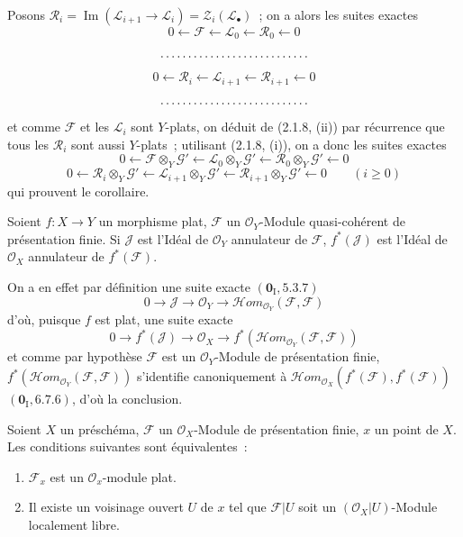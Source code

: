 Posons
$\mathscr R_i=\operatorname{Im}(\mathscr L_{i+1}\to\mathscr L_i)
=\mathscr Z_i(\mathscr L_\bullet)$~; on a alors les suites exactes
\[
0\leftarrow\mathscr F\leftarrow\mathscr L_0\leftarrow\mathscr R_0\leftarrow0
\]
\[
\hbox to 12em{\dotfill}
\]
\[
0\leftarrow\mathscr R_i\leftarrow\mathscr L_{i+1}
\leftarrow\mathscr R_{i+1}\leftarrow0
\]
\[
\hbox to 12em{\dotfill}
\]
et comme $\mathscr F$ et les $\mathscr L_i$ sont $Y$-plats, on déduit de
(2.1.8, (ii)) par récurrence que tous les $\mathscr R_i$ sont aussi
$Y$-plats~; utilisant (2.1.8, (i)), on a donc les suites exactes
\[
0\leftarrow\mathscr F\otimes_Y\mathscr G'
\leftarrow\mathscr L_0\otimes_Y\mathscr G'
\leftarrow\mathscr R_0\otimes_Y\mathscr G'\leftarrow0
\]
\[
0\leftarrow\mathscr R_i\otimes_Y\mathscr G'
\leftarrow\mathscr L_{i+1}\otimes_Y\mathscr G'
\leftarrow\mathscr R_{i+1}\otimes_Y\mathscr G'\leftarrow0
\qquad(i\geq0)
\]
qui prouvent le corollaire.

\begin{proposition}[2.1.11]
\label{IV.2.1.11-fr}
Soient $f:X\to Y$ un morphisme plat, $\mathscr F$ un $\mathcal O_Y$-Module
quasi-cohérent de présentation finie. Si $\mathscr J$ est l'Idéal de
$\mathcal O_Y$ annulateur de $\mathscr F$, $f^*(\mathscr J)$ est l'Idéal de
$\mathcal O_X$ annulateur de $f^*(\mathscr F)$.
\end{proposition}

On a en effet par définition une suite exacte $(\mathbf{0}_{\mathrm I},5.3.7)$
\[
0\to\mathscr J\to\mathcal O_Y\to
\mathscr H\!om_{\mathcal O_Y}(\mathscr F,\mathscr F)
\]
d'où, puisque $f$ est plat, une suite exacte
\[
0\to f^*(\mathscr J)\to\mathcal O_X\to
f^*(\mathscr H\!om_{\mathcal O_Y}(\mathscr F,\mathscr F))
\]
et comme par hypothèse $\mathscr F$ est un $\mathcal O_Y$-Module de
présentation finie,
$f^*(\mathscr H\!om_{\mathcal O_Y}(\mathscr F,\mathscr F))$ s'identifie
canoniquement à
$\mathscr H\!om_{\mathcal O_X}(f^*(\mathscr F),f^*(\mathscr F))$
$(\mathbf{0}_{\mathrm I},6.7.6)$, d'où la conclusion.

\begin{proposition}[2.1.12]
\label{IV.2.1.12-fr}
Soient $X$ un préschéma, $\mathscr F$ un $\mathcal O_X$-Module de présentation
finie, $x$ un point de $X$. Les conditions suivantes sont équivalentes~:
\begin{enumerate}
\item[\emph{a)}] $\mathscr F_x$ est un $\mathcal O_x$-module plat.
\item[\emph{b)}] Il existe un voisinage ouvert $U$ de $x$ tel que
$\mathscr F|U$ soit un $(\mathcal O_X|U)$-Module localement libre.
\end{enumerate}
\end{proposition}

